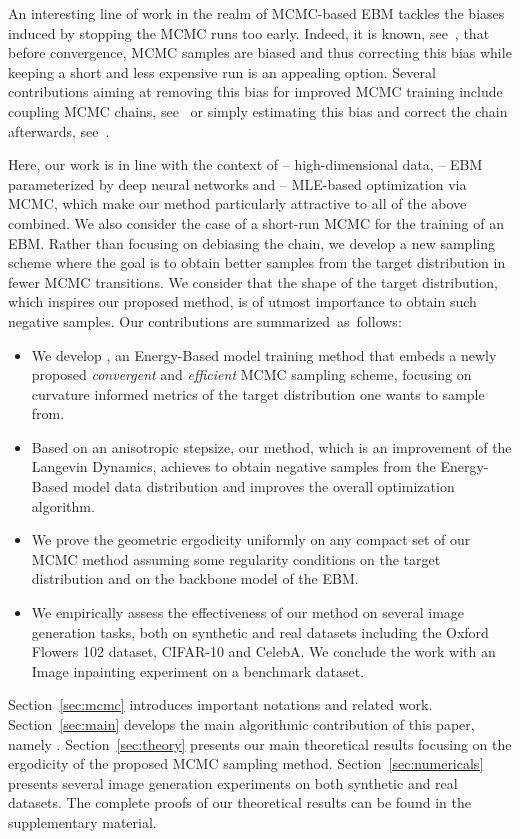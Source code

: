 \documentclass{article} %
\begin{document}
An interesting line of work in the realm of MCMC-based EBM tackles the biases induced by stopping the MCMC runs too early. 
Indeed, it is known, see~\citet{meyn2012markov}, that before convergence, MCMC samples are biased and thus correcting this bias while keeping a short and less expensive run is an appealing option.
Several contributions aiming at removing this bias for improved MCMC training include coupling MCMC chains, see~\citet{qiu2019unbiased,jacob2020unbiased} or simply estimating this bias and correct the chain afterwards, see~\citet{du2020improved}.

Here, our work is in line with the context of -- high-dimensional data, -- EBM parameterized by deep neural networks and -- MLE-based optimization via MCMC, which make our method particularly attractive to all of the above combined. 
We also consider the case of a short-run MCMC for the training of an EBM.
Rather than focusing on debiasing the chain, we develop a new sampling scheme where the goal is to obtain better samples from the target distribution in fewer MCMC transitions.
We consider that the shape of the target distribution, which inspires our proposed method, is of utmost importance to obtain such negative samples.
Our contributions are summarized~as~follows:
\begin{itemize}
\item We develop \algo, an Energy-Based model training method that embeds a newly proposed \emph{convergent} and \emph{efficient} MCMC sampling scheme, focusing on curvature informed metrics of the target distribution one wants to sample from.
\item Based on an anisotropic stepsize, our method, which is an improvement of the Langevin Dynamics, achieves to obtain negative samples from the Energy-Based model data distribution and improves the overall optimization algorithm.
\item We prove the geometric ergodicity uniformly on any compact set of our MCMC method assuming some regularity conditions on the target distribution and on the backbone model of the EBM.
\item We empirically assess the effectiveness of our method on several image generation tasks, both on synthetic and real datasets including the Oxford Flowers 102 dataset, CIFAR-10 and CelebA. We conclude the work with an Image inpainting experiment on a benchmark dataset.
\end{itemize}

Section~\ref{sec:mcmc} introduces important notations and related work.
Section~\ref{sec:main} develops the main algorithmic contribution of this paper, namely \algo.
Section~\ref{sec:theory} presents our main theoretical results focusing on the ergodicity of the proposed MCMC sampling method.
Section~\ref{sec:numericals} presents several image generation experiments on both synthetic and real datasets.
The complete proofs of our theoretical results can be found in the supplementary material.
\end{document}
